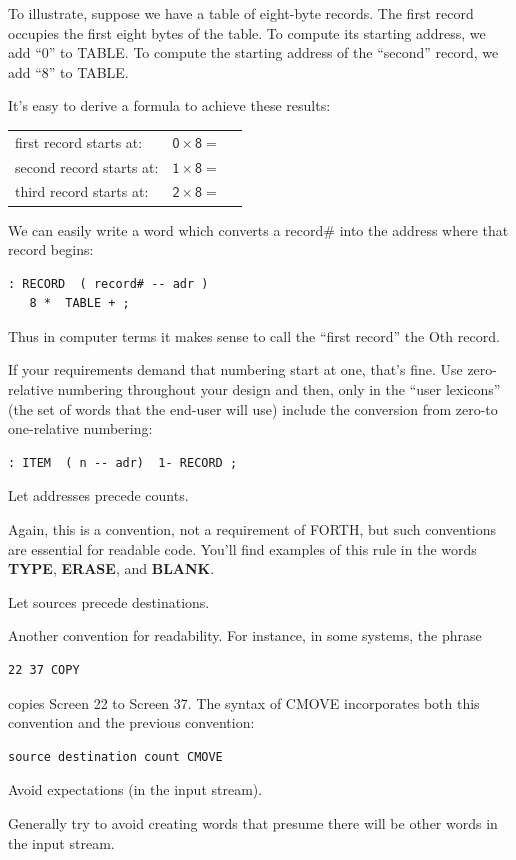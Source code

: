 To illustrate, suppose we have a table of eight-byte records. The
first record occupies the first eight bytes of the table. To compute its
starting address, we add ``0'' to TABLE. To compute the starting address
of the ``second'' record, we add ``8'' to TABLE.



It's easy to derive a formula to achieve these results:

\bigskip
\begin{tabular}{@{}l@{ }l@{}r}
\sf first record starts at:  &  $\mathsf{0 \times 8} = {}$ & \sf 0  \\
\sf second record starts at: &  $\mathsf{1 \times 8} = {}$ & \sf 8  \\
\sf third record starts at:  &  $\mathsf{2 \times 8} = {}$ & \sf 16 \\
\end{tabular}
\bigskip

We can easily write a word which converts a record\# into the address
where that record begins:

\begin{verbatim}
: RECORD  ( record# -- adr )
   8 *  TABLE + ;
\end{verbatim}

Thus in computer terms it makes sense to call the ``first record'' the Oth
record.

If your requirements demand that numbering start at one, that's
fine. Use zero-relative numbering throughout your design and then, only
in the ``user lexicons'' (the set of words that the end-user will use)
include the conversion from zero-to one-relative numbering:
\begin{verbatim}
: ITEM  ( n -- adr)  1- RECORD ;
\end{verbatim}
\begin{tip}
Let addresses precede counts.
\end{tip}
Again, this is a convention, not a requirement of FORTH, but such conventions
are essential for readable code. You'll find examples of this rule
in the words \textbf{TYPE}, \textbf{ERASE}, and \textbf{BLANK}.
\begin{tip}
Let sources precede destinations.
\end{tip}
Another convention for readability. For instance, in some systems, the
phrase
\begin{verbatim}
22 37 COPY
\end{verbatim}
copies Screen 22 to Screen 37. The syntax of CMOVE incorporates both
this convention and the previous convention:
\begin{verbatim}
source destination count CMOVE
\end{verbatim}
\begin{tip}
Avoid expectations (in the input stream).
\end{tip}
Generally try to avoid creating words that presume there will be other
words in the input stream.

